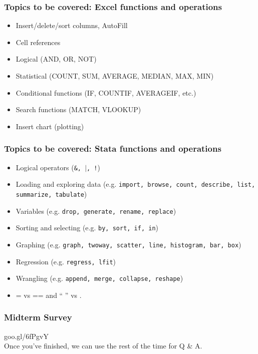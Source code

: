 \documentclass[11pt]{beamer}
\begin{document}
\begin{frame}
\frametitle{Topics to be covered: Excel functions and operations}
\begin{itemize} \itemsep1em
	\item Insert/delete/sort columns, AutoFill
	\item Cell references
	\item Logical (AND, OR, NOT)
	\item Statistical (COUNT, SUM, AVERAGE, MEDIAN, MAX, MIN)
	\item Conditional functions (IF, COUNTIF, AVERAGEIF, etc.)
	\item Search functions (MATCH, VLOOKUP) 
	\item Insert chart (plotting)
\end{itemize}
\end{frame}

\begin{frame}
\frametitle{Topics to be covered: Stata functions and operations}
\begin{itemize} \itemsep1em
	\item Logical operators (\texttt{\&, $\vert$, !})
	\item Loading and exploring data (e.g. \texttt{import, browse, count, describe, list, summarize, tabulate})
	\item Variables (e.g. \texttt{drop, generate, rename, replace})
	\item Sorting and selecting (e.g. \texttt{by, sort, if, in})
	\item Graphing (e.g. \texttt{graph, twoway, scatter, line, histogram, bar, box})
	\item Regression (e.g. \texttt{regress, lfit}) 
	\item Wrangling (e.g. \texttt{append, merge, collapse, reshape}) 
	\item = vs == and `` '' vs .
\end{itemize}
\end{frame}

\begin{frame}
    \frametitle{Midterm Survey}
    \begin{center}
 goo.gl/6fPgvY \\
 \bigskip
Once you've finished, we can use the rest of the time for Q \& A. 
    \end{center}
\end{frame}
\end{document}
